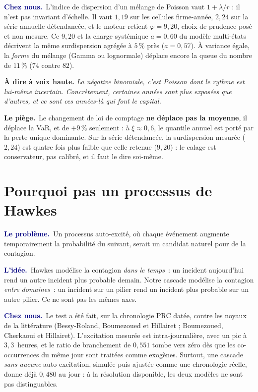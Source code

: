 \documentclass[11pt,a4paper]{article}
\newcommand{\lequoi}[1]{\smallskip\noindent\textcolor{navy}{\textbf{Le problème.}}\ #1\par}
\newcommand{\lidee}[1]{\smallskip\noindent\textcolor{navy}{\textbf{L'idée.}}\ #1\par}
\newcommand{\cheznous}[1]{\smallskip\noindent\textcolor{navy}{\textbf{Chez nous.}}\ #1\par}
\newcommand{\lepiege}[1]{\smallskip\noindent\textcolor{accent}{\textbf{Le piège.}}\ #1\par}
\newcommand{\laphrase}[1]{\begin{phrasebox}\textbf{À dire à voix haute.} \emph{#1}\end{phrasebox}}
\begin{document}
\cheznous{L'indice de dispersion d'un mélange de Poisson vaut $1+\lambda/r$ : il n'est pas
invariant d'échelle. Il vaut $1{,}19$ sur les cellules firme-année, $2{,}24$ sur la série annuelle
détendancée, et le moteur retient $\varphi=9{,}20$, choix de prudence posé et non mesure. Ce
$9{,}20$ et la charge systémique $a=0{,}60$ du modèle multi-états décrivent la même surdispersion
agrégée à $5\,\%$ près ($a=0{,}57$). À variance égale, la \emph{forme} du mélange (Gamma ou
lognormale) déplace encore la queue du nombre de $11\,\%$ ($74$ contre $82$).}

\laphrase{La négative binomiale, c'est Poisson dont le rythme est lui-même incertain.
Concrètement, certaines années sont plus exposées que d'autres, et ce sont ces années-là
qui font le capital.}

\lepiege{Le changement de loi de comptage \textbf{ne déplace pas la moyenne}, il déplace la
VaR, et de $+9\,\%$ seulement : à $\xi\approx0{,}6$, le quantile annuel est porté par la perte
unique dominante. Sur la série détendancée, la surdispersion mesurée ($2{,}24$) est quatre fois
plus faible que celle retenue ($9{,}20$) : le calage est conservateur, pas calibré, et il faut le
dire soi-même.}

\section{Pourquoi pas un processus de Hawkes}

\lequoi{Un processus auto-excité, où chaque événement augmente temporairement la
probabilité du suivant, serait un candidat naturel pour de la contagion.}

\lidee{Hawkes modélise la contagion \emph{dans le temps}~: un incident aujourd'hui rend un
autre incident plus probable demain. Notre cascade modélise la contagion \emph{entre
domaines}~: un incident sur un pilier rend un incident plus probable sur un autre pilier.
Ce ne sont pas les mêmes axes.}

\cheznous{Le test a été fait, sur la chronologie PRC datée, contre les noyaux de la
littérature (Bessy-Roland, Boumezoued et Hillairet ; Boumezoued, Cherkaoui et Hillairet).
L'excitation mesurée est intra-journalière, avec un pic à $3{,}3$~heures, et le ratio de
branchement de $0{,}551$ tombe vers zéro dès que les co-occurrences du même jour sont traitées
comme exogènes. Surtout, une cascade \emph{sans aucune} auto-excitation, simulée puis ajustée comme
une chronologie réelle, donne déjà $0{,}480$ au jour : à la résolution disponible, les deux
modèles ne sont pas distinguables.}
\end{document}
